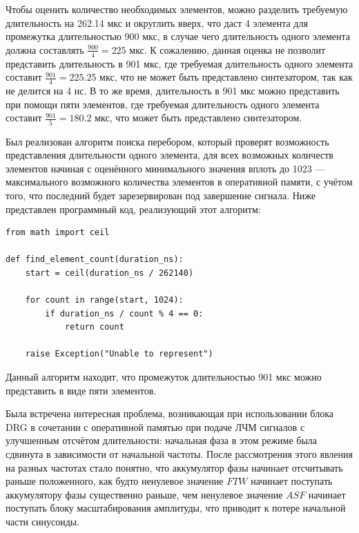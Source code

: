 \documentclass[rusmathsym, eqnumwithinsec, amspack, hyperref]{bomgost}
\begin{document}
Чтобы оценить количество необходимых элементов, можно разделить требуемую длительность на 262.14 мкс и округлить вверх, что даст 4 элемента для промежутка длительностью 900 мкс, в случае чего длительность одного элемента должна составлять $\frac{900}{4}=225$ мкс. К сожалению, данная оценка не позволит представить длительность в 901 мкс, где требуемая длительность одного элемента составит $\frac{901}{4}=225.25$ мкс, что не может быть представлено синтезатором, так как не делится на 4 нс. В то же время, длительность в 901 мкс можно представить при помощи пяти элементов, где требуемая длительность одного элемента составит $\frac{901}{5}=180.2$ мкс, что может быть представлено синтезатором.

Был реализован алгоритм поиска перебором, который проверят возможность представления длительности одного элемента, для всех возможных количеств элементов начиная с оценённого минимального значения вплоть до 1023 --- максимального возможного количества элементов в оперативной памяти, с учётом того, что последний будет зарезервирован под завершение сигнала. Ниже представлен программный код, реализующий этот алгоритм:

\lstset{
	language=python,
	basicstyle=\scriptsize\ttfamily,
	numbers=left,
	stepnumber=1,
	showstringspaces=false,
	tabsize=4,
	breaklines=true,
	breakatwhitespace=false,
	xleftmargin=.1\textwidth, xrightmargin=.1\textwidth,
	belowskip=1em, aboveskip=1em
}
\begin{lstlisting}
from math import ceil

def find_element_count(duration_ns):
	start = ceil(duration_ns / 262140)

	for count in range(start, 1024):
		if duration_ns / count % 4 == 0:
			return count

	raise Exception("Unable to represent")
\end{lstlisting}

Данный алгоритм находит, что промежуток длительностью 901 мкс можно представить в виде пяти элементов.

Была встречена интересная проблема, возникающая при использовании блока DRG в сочетании с оперативной памятью при подаче ЛЧМ сигналов с улучшенным отсчётом длительности: начальная фаза в этом режиме была сдвинута в зависимости от начальной частоты. После рассмотрения этого явления на разных частотах стало понятно, что аккумулятор фазы начинает отсчитывать раньше положенного, как будто ненулевое значение $FTW$ начинает поступать аккумулятору фазы существенно раньше, чем ненулевое значение $ASF$ начинает поступать блоку масштабирования амплитуды, что приводит к потере начальной части синусоиды.
\end{document}
